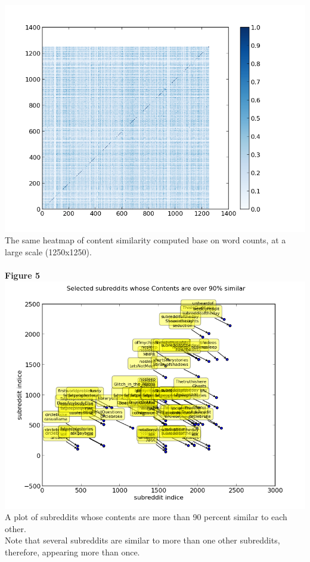 \documentclass[10pt]{article}
\begin{document}
\includegraphics[scale=0.5]{W1250}\\ 
The same heatmap of content similarity computed base on word counts, at a large scale (1250x1250). \\
\pagebreak\\
\textbf{Figure 5}\\
\includegraphics[scale=0.7]{content90}\\
A plot of subreddits whose contents are more than 90 percent similar to each other.\\
Note that several subreddits are similar to more than one other subreddits, therefore, appearing more than once.\\
\pagebreak\\
\end{document}
